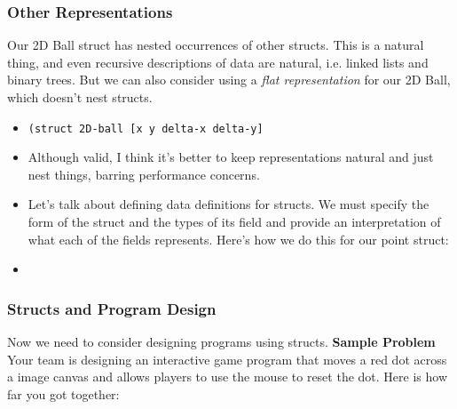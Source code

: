 \documentclass{beamer}
\begin{document}
\begin{frame}
  \frametitle{Other Representations}
  Our 2D Ball struct has nested occurrences of other structs. This is a natural thing, and even recursive descriptions of data are natural, i.e.
  linked lists and binary trees. But we can also consider using a \emph{flat representation} for our 2D Ball, which doesn't nest structs.
  \begin{itemize}
  \item<2-> \texttt{(struct 2D-ball [x y delta-x delta-y]}
  \item<3-> Although valid, I think it's better to keep representations natural and just nest things, barring performance concerns.
  \item<4-> Let's talk about defining data definitions for structs. We must specify the form of the struct and the types of its field and provide an interpretation of what
    each of the fields represents. Here's how we do this for our point struct:
  \item<5->\pointDefinition
  \end{itemize}
\end{frame}


\begin{frame}
  \frametitle{Structs and Program Design}
  Now we need to consider designing programs using structs.
  \textbf{Sample Problem} Your team is designing an interactive game program that moves a red dot across a image canvas and allows players to use the mouse to reset the dot. Here is how far you got together: \pause
  \moveDotStart
\end{frame}


\end{document}
